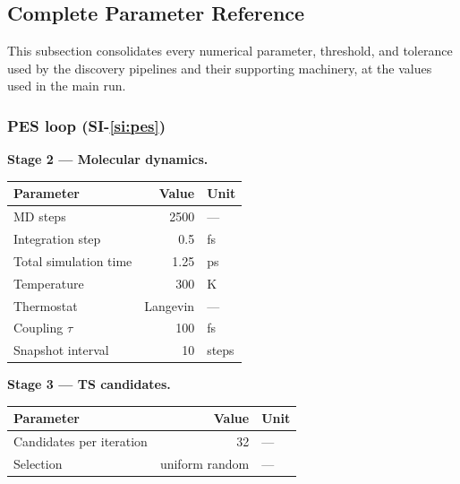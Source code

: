 
%
%

\subsection{Complete Parameter Reference}
\label{si:parameters}

This subsection consolidates every numerical parameter, threshold, and tolerance used by the discovery pipelines and their supporting machinery, at the values used in the main run.

\bigskip

\subsubsection{PES loop (SI-\ref{si:pes})}
\label{sec:params-pes}

\noindent\textbf{Stage 2 --- Molecular dynamics.}\par\nopagebreak
\noindent\begin{tabular}{p{5cm}rl}
\toprule
Parameter & Value & Unit \\
\midrule
MD steps & 2500 & --- \\
Integration step & 0.5 & fs \\
Total simulation time & 1.25 & ps \\
Temperature & 300 & K \\
Thermostat & Langevin & --- \\
Coupling $\tau$ & 100 & fs \\
Snapshot interval & 10 & steps \\
\bottomrule
\end{tabular}

\bigskip

\noindent\textbf{Stage 3 --- TS candidates.}\par\nopagebreak
\noindent\begin{tabular}{p{5cm}rl}
\toprule
Parameter & Value & Unit \\
\midrule
Candidates per iteration & 32 & --- \\
Selection & uniform random & --- \\
\bottomrule
\end{tabular}

